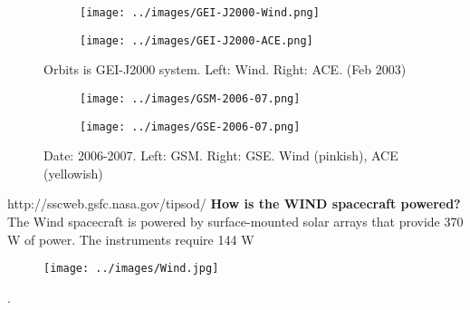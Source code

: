 \begin{figure}[h]
  \centering
  \begin{subfigure}[1a]{0.4\textwidth}
    \centering
    \texttt{[image: ../images/GEI-J2000-Wind.png]}
  \end{subfigure}
  \hfill
  \begin{subfigure}[1b]{0.4\textwidth}
    \centering
    \texttt{[image: ../images/GEI-J2000-ACE.png]}
  \end{subfigure}
  \caption{Orbits is GEI-J2000 system. Left: Wind. Right: ACE. (Feb
  2003)}
  \label{fig-gei}
\end{figure}


\begin{figure}[h]
  \centering
  \begin{subfigure}[1a]{0.4\textwidth}
    \centering
    \texttt{[image: ../images/GSM-2006-07.png]}
  \end{subfigure}
  \hfill
  \begin{subfigure}[1b]{0.4\textwidth}
    \centering
    \texttt{[image: ../images/GSE-2006-07.png]}
  \end{subfigure}
  \caption{Date: 2006-2007. Left: GSM. Right: GSE. Wind (pinkish), ACE
  (yellowish)}
  \label{fig-2006-07}
\end{figure}


http://sscweb.gsfc.nasa.gov/tipsod/
\textbf{How is the WIND spacecraft powered?}
The Wind spacecraft is powered by surface-mounted solar arrays that
provide 370 W of power. The instruments require 144 W

\begin{figure}[ht]
  \centering
  \texttt{[image: ../images/Wind.jpg]}
  \caption{\label{}}
\end{figure}.
